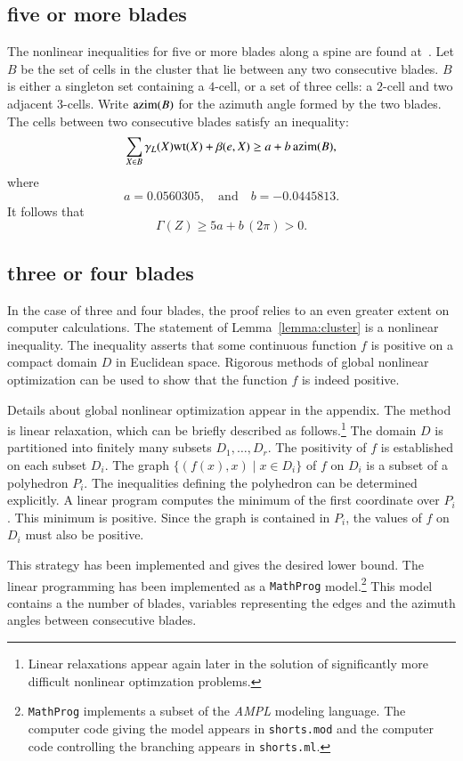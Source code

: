 \subsection{five or more blades}

The nonlinear inequalities for five or more blades along a spine are found at~\cite[ZTGIJCF]{hales:2009:nonlinear}.   %
Let $B$ be the set of cells in the cluster that lie between any two consecutive blades.  $B$ is either a singleton set containing a $4$-cell, or a set of three cells: a $2$-cell and two adjacent $3$-cells.  Write ${\operatorname{azim}}(B)$ for the azimuth angle formed by the two blades.   The cells between two consecutive blades satisfy an inequality:
$$
\sum_{X\in B} \gamma_L(X){\operatorname{wt}}(X) + \beta(e,X) \ge a + b\,{\operatorname{azim}}(B),
$$
where
$$
a= 0.0560305, \quad\text{and}\quad  b= -0.0445813.
$$
It follows that
$$
\Gamma(Z) \ge 5 a + b\, (2\pi) > 0.
$$

\subsection{three or four blades}\label{sec:3or4}

In the case of three and four blades, the proof relies to an even greater extent on computer calculations.  The statement of Lemma~\ref{lemma:cluster} is a nonlinear inequality.   The inequality asserts that some continuous function $f$ is positive on a compact domain $D$ in Euclidean space.  Rigorous methods of global nonlinear optimization can be used to show that the function $f$ is indeed positive.  

Details about global nonlinear optimization appear in the appendix.   The method is linear relaxation, which can be briefly described as follows.\footnote{Linear relaxations appear again later in the solution of significantly more difficult nonlinear optimzation problems.}  The domain $D$ is partitioned into finitely many subsets $D_1,\ldots, D_r$.   The positivity of $f$ is
established on each subset $D_i$.    The graph $\{(f(x), x)\mid x\in D_i\}$ 
of $f$ on $D_i$ is a subset of a polyhedron $P_i$.  The inequalities defining the polyhedron can be determined explicitly.    A linear program computes the minimum of the first coordinate over $P_i$.  This
minimum is positive.  Since the graph is contained in $P_i$, the values of $f$ on $D_i$ must also be
positive.

This strategy has been implemented and gives the desired lower bound.  
The linear programming has been implemented as a  
{\tt MathProg} model.\footnote{{\tt MathProg} implements a subset of the {\it AMPL} modeling language.  The computer code giving the model appears in {\tt shorts.mod} and the computer code controlling the branching appears in {\tt shorts.ml}.}  This model contains a the number of blades, variables representing the edges and the azimuth angles between consecutive blades.

